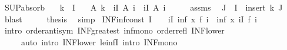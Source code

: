 \begin{isabellebody}
\endisatagproof
{\isafoldproof}%
%
\isadelimproof
\isanewline
%
\endisadelimproof
\isanewline
{}\isamarkupfalse%
\ SUP{\isacharunderscore}{\kern0pt}absorb{\isacharcolon}{\kern0pt}\isanewline
\ \ \ {\isachardoublequoteopen}k\ {\isasymin}\ I{\isachardoublequoteclose}\isanewline
\ \ \ {\isachardoublequoteopen}A\ k\ {\isasymsqunion}\ {\isacharparenleft}{\kern0pt}{\isasymSqunion}i{\isasymin}I{\isachardot}{\kern0pt}\ A\ i{\isacharparenright}{\kern0pt}\ {\isacharequal}{\kern0pt}\ {\isacharparenleft}{\kern0pt}{\isasymSqunion}i{\isasymin}I{\isachardot}{\kern0pt}\ A\ i{\isacharparenright}{\kern0pt}{\isachardoublequoteclose}\isanewline
%
\isadelimproof
%
\endisadelimproof
%
\isatagproof
{}\isamarkupfalse%
\ {\isacharminus}{\kern0pt}\isanewline
\ \ \isamarkupfalse%
\ assms\ \isamarkupfalse%
\ J\ \ {\isachardoublequoteopen}I\ {\isacharequal}{\kern0pt}\ insert\ k\ J{\isachardoublequoteclose}\ \isamarkupfalse%
\ blast\isanewline
\ \ \isamarkupfalse%
\ \isamarkupfalse%
\ {\isacharquery}{\kern0pt}thesis\ \isamarkupfalse%
\ simp\isanewline
{}\isamarkupfalse%
%
\endisatagproof
{\isafoldproof}%
%
\isadelimproof
\isanewline
%
\endisadelimproof
\isanewline
{}\isamarkupfalse%
\ INF{\isacharunderscore}{\kern0pt}inf{\isacharunderscore}{\kern0pt}const{}{\isacharcolon}{\kern0pt}\ {\isachardoublequoteopen}I\ {\isasymnoteq}\ {\isacharbraceleft}{\kern0pt}{\isacharbraceright}{\kern0pt}\ {\isasymLongrightarrow}\ {\isacharparenleft}{\kern0pt}{\isasymSqinter}i{\isasymin}I{\isachardot}{\kern0pt}\ inf\ x\ {\isacharparenleft}{\kern0pt}f\ i{\isacharparenright}{\kern0pt}{\isacharparenright}{\kern0pt}\ {\isacharequal}{\kern0pt}\ inf\ x\ {\isacharparenleft}{\kern0pt}{\isasymSqinter}i{\isasymin}I{\isachardot}{\kern0pt}\ f\ i{\isacharparenright}{\kern0pt}{\isachardoublequoteclose}\isanewline
%
\isadelimproof
\ \ %
\endisadelimproof
%
\isatagproof
{}\isamarkupfalse%
\ {\isacharparenleft}{\kern0pt}intro\ order{\isachardot}{\kern0pt}antisym\ INF{\isacharunderscore}{\kern0pt}greatest\ inf{\isacharunderscore}{\kern0pt}mono\ order{\isacharunderscore}{\kern0pt}refl\ INF{\isacharunderscore}{\kern0pt}lower{\isacharparenright}{\kern0pt}\isanewline
\ \ \ \ \ {\isacharparenleft}{\kern0pt}auto\ intro{\isacharcolon}{\kern0pt}\ INF{\isacharunderscore}{\kern0pt}lower{}\ le{\isacharunderscore}{\kern0pt}infI{}\ intro{\isacharbang}{\kern0pt}{\isacharcolon}{\kern0pt}\ INF{\isacharunderscore}{\kern0pt}mono{\isacharparenright}{\kern0pt}%

\end{isabellebody}
